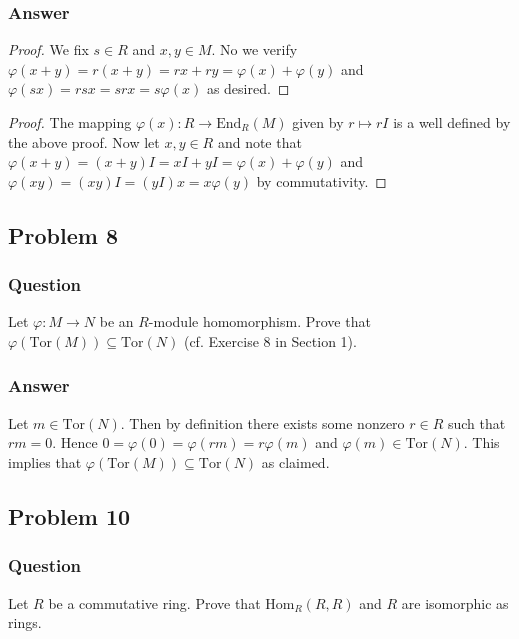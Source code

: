 \documentclass[12pt]{article}
\begin{document}
\subsubsection{Answer}
\begin{proof}
We fix $s \in R $ and $x,y \in M$. No we verify  $\varphi(x+y) = r (x+y) = r x + r y= \varphi(x)+ \varphi(y)  $ and $\varphi( s x ) = r s x = s r x = s \varphi(x)$ as desired.
\end{proof}

\begin{proof}
The mapping $\varphi(x) : R \to \mathrm{End}_R (M)$ given by $r \mapsto r I $ is a well defined by the above proof. Now let $x,y \in R$ and note that $\varphi(x + y) = (x+y)I  = xI + y I = \varphi(x)+ \varphi(y)$ and $\varphi(x y) =(x y) I = (y I) x = x \varphi(y)$ by commutativity.
\end{proof}

\subsection{Problem 8}

\subsubsection{Question}
Let $\varphi : M \to N$ be an $R$-module homomorphism. Prove that $\varphi(\mathrm{Tor}(M)) \subseteq \mathrm{Tor}(N)$ (cf. Exercise 8 in Section 1).

\subsubsection{Answer}
Let $m \in \mathrm{Tor}(N)$. Then by definition there exists some nonzero $r \in R $ such that $ r m =0$. Hence $0 = \varphi(0) = \varphi(r m ) = r  \varphi(m)$ and $\varphi(m) \in  \mathrm{Tor}(N)$. This implies that $\varphi(\mathrm{Tor}(M)) \subseteq \mathrm{Tor}(N)$ as claimed.


\subsection{Problem 10}

\subsubsection{Question}
Let $R$ be a commutative ring. Prove that $\mathrm{Hom}_R(R,R)$ and $R$ are isomorphic as rings.
\end{document}
